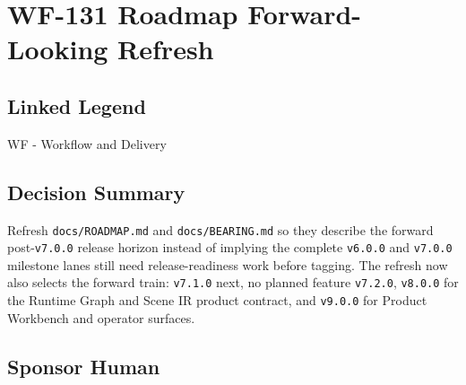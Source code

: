 \chapter{WF-131 Roadmap Forward-Looking Refresh}\label{record-213}

\smallskip

\section{Linked Legend}\label{record-213-linked-legend}

WF - Workflow and Delivery

\section{Decision Summary}\label{record-213-decision-summary}

Refresh \texttt{d\allowbreak{}o\allowbreak{}c\allowbreak{}s\allowbreak{}/\allowbreak{}R\allowbreak{}O\allowbreak{}A\allowbreak{}D\allowbreak{}M\allowbreak{}A\allowbreak{}P\allowbreak{}.\allowbreak{}m\allowbreak{}d} and \texttt{d\allowbreak{}o\allowbreak{}c\allowbreak{}s\allowbreak{}/\allowbreak{}B\allowbreak{}E\allowbreak{}A\allowbreak{}R\allowbreak{}I\allowbreak{}N\allowbreak{}G\allowbreak{}.\allowbreak{}m\allowbreak{}d} so they describe the forward post-\texttt{v\allowbreak{}7\allowbreak{}.\allowbreak{}0\allowbreak{}.\allowbreak{}0} release horizon instead of implying the complete \texttt{v\allowbreak{}6\allowbreak{}.\allowbreak{}0\allowbreak{}.\allowbreak{}0} and \texttt{v\allowbreak{}7\allowbreak{}.\allowbreak{}0\allowbreak{}.\allowbreak{}0} milestone lanes still need release-readiness work before tagging. The refresh now also selects the forward train: \texttt{v\allowbreak{}7\allowbreak{}.\allowbreak{}1\allowbreak{}.\allowbreak{}0} next, no planned feature \texttt{v\allowbreak{}7\allowbreak{}.\allowbreak{}2\allowbreak{}.\allowbreak{}0}, \texttt{v\allowbreak{}8\allowbreak{}.\allowbreak{}0\allowbreak{}.\allowbreak{}0} for the Runtime Graph and Scene IR product contract, and \texttt{v\allowbreak{}9\allowbreak{}.\allowbreak{}0\allowbreak{}.\allowbreak{}0} for Product Workbench and operator surfaces.

\section{Sponsor Human}\label{record-213-sponsor-human}

